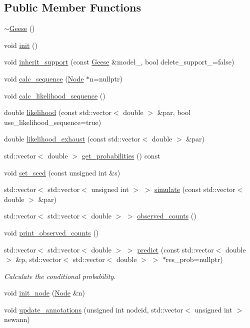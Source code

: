 \subsection*{Public Member Functions}
\begin{DoxyCompactItemize}
\item 
\hyperlink{class_geese_a8b665d6faea65caacbb00feea98d53b0}{$\sim$\+Geese} ()
\item 
void \hyperlink{class_geese_ad830d504a390c6126c916e24dc16e69d}{init} ()
\item 
void \hyperlink{class_geese_aa95abe540b9977592bcc88e77619d070}{inherit\+\_\+support} (const \hyperlink{class_geese}{Geese} \&model\+\_\+, bool delete\+\_\+support\+\_\+=false)
\item 
void \hyperlink{class_geese_aa71af5fe38d785cc184c904fc9308dc1}{calc\+\_\+sequence} (\hyperlink{class_node}{Node} $\ast$n=nullptr)
\item 
void \hyperlink{class_geese_a1abfd10b18e87a638ef386c919417500}{calc\+\_\+likelihood\+\_\+sequence} ()
\item 
double \hyperlink{class_geese_a930b8c710a6be9c4f6ad94d50afc0512}{likelihood} (const std\+::vector$<$ double $>$ \&par, bool use\+\_\+likelihood\+\_\+sequence=true)
\item 
double \hyperlink{class_geese_af2d4bac42cc7c8287fb6853d50882115}{likelihood\+\_\+exhaust} (const std\+::vector$<$ double $>$ \&par)
\item 
std\+::vector$<$ double $>$ \hyperlink{class_geese_a5c9cf28a69270fe4d3f48984fe2c5723}{get\+\_\+probabilities} () const
\item 
void \hyperlink{class_geese_aa5d623d5e242a29090bf5a01bfeeeb9f}{set\+\_\+seed} (const unsigned int \&s)
\item 
std\+::vector$<$ std\+::vector$<$ unsigned int $>$ $>$ \hyperlink{class_geese_a675662efdded0d24c146946aa15ed481}{simulate} (const std\+::vector$<$ double $>$ \&par)
\item 
std\+::vector$<$ std\+::vector$<$ double $>$ $>$ \hyperlink{class_geese_a82def7c8a870aa1b3ec069099c01fe02}{observed\+\_\+counts} ()
\item 
void \hyperlink{class_geese_a3b63231475f73a59b94bb4443c8aa7b8}{print\+\_\+observed\+\_\+counts} ()
\item 
std\+::vector$<$ std\+::vector$<$ double $>$ $>$ \hyperlink{class_geese_a36018dcd49e5f761d888fa518a728b08}{predict} (const std\+::vector$<$ double $>$ \&p, std\+::vector$<$ std\+::vector$<$ double $>$ $>$ $\ast$res\+\_\+prob=nullptr)
\begin{DoxyCompactList}\small\item\em Calculate the conditional probability. \end{DoxyCompactList}\item 
void \hyperlink{class_geese_a3855898a556e2ac1d30529d3bc35f13a}{init\+\_\+node} (\hyperlink{class_node}{Node} \&n)
\item 
void \hyperlink{class_geese_a5d3f0a97dd5d37b6f6cfd79c41629a1a}{update\+\_\+annotations} (unsigned int nodeid, std\+::vector$<$ unsigned int $>$ newann)
\end{DoxyCompactItemize}
